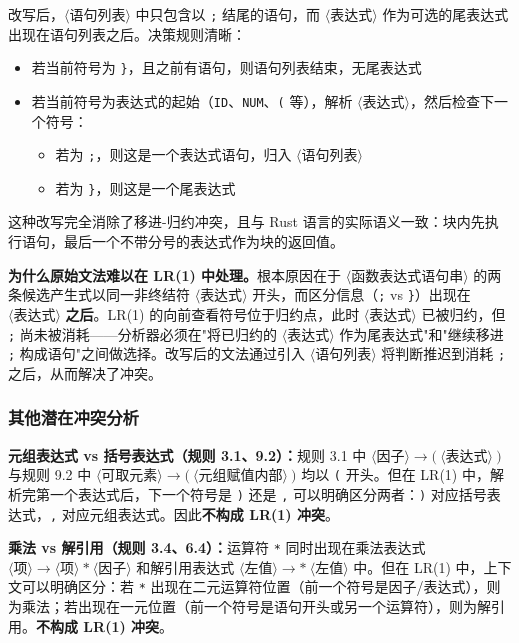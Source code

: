 \documentclass[12pt,a4paper]{ctexart}
\begin{document}
改写后，$\langle\text{语句列表}\rangle$ 中只包含以 \texttt{;} 结尾的语句，而 $\langle\text{表达式}\rangle$ 作为可选的尾表达式出现在语句列表之后。决策规则清晰：
\begin{itemize}
    \item 若当前符号为 \texttt{\}}，且之前有语句，则语句列表结束，无尾表达式
    \item 若当前符号为表达式的起始（\texttt{ID}、\texttt{NUM}、\texttt{(} 等），解析 $\langle\text{表达式}\rangle$，然后检查下一个符号：
    \begin{itemize}
        \item 若为 \texttt{;}，则这是一个表达式语句，归入 $\langle\text{语句列表}\rangle$
        \item 若为 \texttt{\}}，则这是一个尾表达式
    \end{itemize}
\end{itemize}

这种改写完全消除了移进-归约冲突，且与 Rust 语言的实际语义一致：块内先执行语句，最后一个不带分号的表达式作为块的返回值。

\textbf{为什么原始文法难以在 LR(1) 中处理。}根本原因在于 $\langle\text{函数表达式语句串}\rangle$ 的两条候选产生式以同一非终结符 $\langle\text{表达式}\rangle$ 开头，而区分信息（\texttt{;} vs \texttt{\}}）出现在 $\langle\text{表达式}\rangle$ \textbf{之后}。LR(1) 的向前查看符号位于归约点，此时 $\langle\text{表达式}\rangle$ 已被归约，但 \texttt{;} 尚未被消耗——分析器必须在"将已归约的 $\langle\text{表达式}\rangle$ 作为尾表达式"和"继续移进 \texttt{;} 构成语句"之间做选择。改写后的文法通过引入 $\langle\text{语句列表}\rangle$ 将判断推迟到消耗 \texttt{;} 之后，从而解决了冲突。

\subsubsection{其他潜在冲突分析}

\textbf{元组表达式 vs 括号表达式（规则 3.1、9.2）：}规则 3.1 中 $\langle\text{因子}\rangle \rightarrow \texttt{(} \ \langle\text{表达式}\rangle \ \texttt{)}$ 与规则 9.2 中 $\langle\text{可取元素}\rangle \rightarrow \texttt{(} \ \langle\text{元组赋值内部}\rangle \ \texttt{)}$ 均以 \texttt{(} 开头。但在 LR(1) 中，解析完第一个表达式后，下一个符号是 \texttt{)} 还是 \texttt{,} 可以明确区分两者：\texttt{)} 对应括号表达式，\texttt{,} 对应元组表达式。因此\textbf{不构成 LR(1) 冲突}。

\textbf{乘法 vs 解引用（规则 3.4、6.4）：}运算符 \texttt{*} 同时出现在乘法表达式 $\langle\text{项}\rangle \rightarrow \langle\text{项}\rangle \ \texttt{*} \ \langle\text{因子}\rangle$ 和解引用表达式 $\langle\text{左值}\rangle \rightarrow \texttt{*} \ \langle\text{左值}\rangle$ 中。但在 LR(1) 中，上下文可以明确区分：若 \texttt{*} 出现在二元运算符位置（前一个符号是因子/表达式），则为乘法；若出现在一元位置（前一个符号是语句开头或另一个运算符），则为解引用。\textbf{不构成 LR(1) 冲突}。
\end{document}
